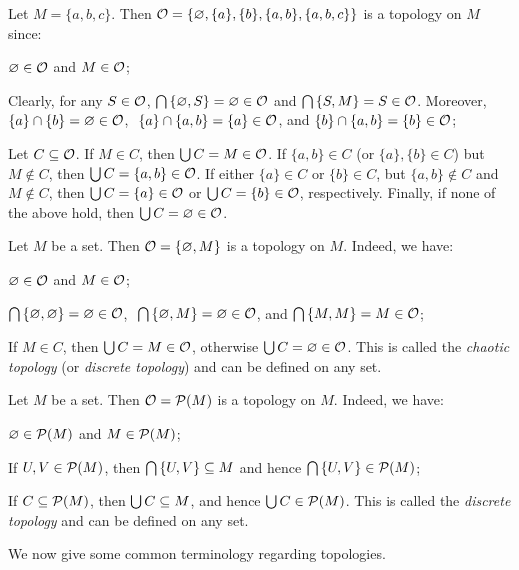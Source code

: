 \be
Let $M = \{a,b,c\}$. Then $\mathcal{O}=\{\varnothing,\{a\},\{b\},\{a,b\},\{a,b,c\}\}$ is a topology on $M$ since:
\ben
\item[i)] $\varnothing \in \mathcal{O}$ and $M \in \mathcal{O}$;
\item[ii)] Clearly, for any $S \in \mathcal{O}$, $\bigcap\,\{\varnothing,S\}=\varnothing\in\mathcal{O}$ and $\bigcap\,\{S,M\}=S\in\mathcal{O}$. Moreover, $\{a\}\cap\{b\}=\varnothing\in\mathcal{O}$, $\ \{a\}\cap\{a,b\} =\{a\}\in \mathcal{O}$, and $\{b\}\cap\{a,b\} =\{b\}\in \mathcal{O}$;
\item[iii)] Let $C\subseteq\mathcal{O}$. If $M \in C$, then $\bigcup C = M\in \mathcal{O}$. If $\{a,b\} \in C$ (or $\{a\},\{b\}\in C$) but $M \notin C$, then $\bigcup C = \{a,b\}\in \mathcal{O}$. If either $\{a\}\in C$ or $\{b\}\in C$, but $\{a,b\} \notin C$ and $M \notin C$, then $\bigcup C = \{a\}\in \mathcal{O}$ or $\bigcup C = \{b\}\in \mathcal{O}$, respectively. Finally, if none of the above hold, then $\bigcup C = \varnothing \in \mathcal{O}$.
\een
\ee

\be
Let $M$ be a set. Then $\mathcal{O}=\{\varnothing , M\}$ is a topology on $M$. Indeed, we have:
\ben
\item[i)] $\varnothing \in \mathcal{O}$ and $M \in \mathcal{O}$;
\item[ii)] $\bigcap\, \{\varnothing,\varnothing\} = \varnothing \in \mathcal{O}$, $\ \bigcap\, \{\varnothing,M\} = \varnothing \in \mathcal{O}$, and $\bigcap\, \{M,M\} = M \in \mathcal{O}$;
\item[iii)] If $M \in C$, then $\bigcup C = M \in \mathcal{O}$, otherwise $\bigcup C = \varnothing \in \mathcal{O}$.
\een
This is called the \emph{chaotic topology} (or
\emph{discrete topology}) and can be defined on any set.
\ee

\be
Let $M$ be a set. Then $\mathcal{O}=\mathcal{P}(M)$ is a topology on $M$. Indeed, we have:
\ben
\item[i)] $\varnothing \in \mathcal{P}(M)$ and $M \in \mathcal{P}(M)$;
\item[ii)] If $U,V \in \mathcal{P}(M)$, then $\bigcap\, \{U,V\} \subseteq M$ and hence $\bigcap\, \{U,V\} \in \mathcal{P}(M)$;
\item[iii)] If $C\subseteq\mathcal{P}(M)$, then $\bigcup C \subseteq M$, and hence $\bigcup C \in \mathcal{P}(M)$.
\een
This is called the \emph{discrete topology} and can be defined on any set.
\ee




We now give some common terminology regarding topologies.


